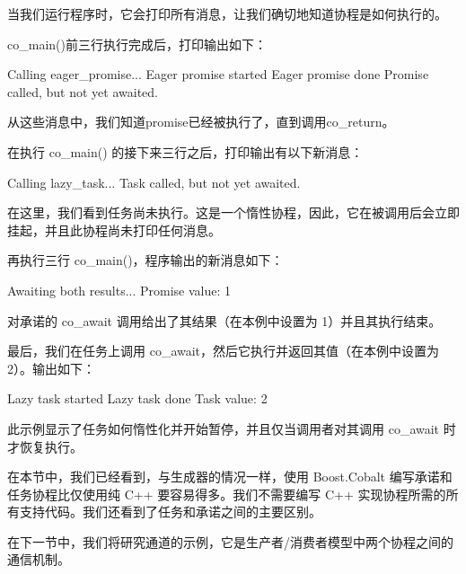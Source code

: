 当我们运行程序时，它会打印所有消息，让我们确切地知道协程是如何执行的。

co\_main()前三行执行完成后，打印输出如下：

\begin{shell}
Calling eager_promise...
Eager promise started
Eager promise done
Promise called, but not yet awaited.
\end{shell}

从这些消息中，我们知道promise已经被执行了，直到调用co\_return。

在执行 co\_main() 的接下来三行之后，打印输出有以下新消息：

\begin{shell}
Calling lazy_task...
Task called, but not yet awaited.
\end{shell}

在这里，我们看到任务尚未执行。这是一个惰性协程，因此，它在被调用后会立即挂起，并且此协程尚未打印任何消息。

再执行三行 co\_main()，程序输出的新消息如下：

\begin{shell}
Awaiting both results...
Promise value: 1
\end{shell}

对承诺的 co\_await 调用给出了其结果（在本例中设置为 1）并且其执行结束。

最后，我们在任务上调用 co\_await，然后它执行并返回其值（在本例中设置为 2）。输出如下：

\begin{shell}
Lazy task started
Lazy task done
Task value: 2
\end{shell}

此示例显示了任务如何惰性化并开始暂停，并且仅当调用者对其调用 co\_await 时才恢复执行。

在本节中，我们已经看到，与生成器的情况一样，使用 Boost.Cobalt 编写承诺和任务协程比仅使用纯 C++ 要容易得多。我们不需要编写 C++ 实现协程所需的所有支持代码。我们还看到了任务和承诺之间的主要区别。

在下一节中，我们将研究通道的示例，它是生产者/消费者模型中两个协程之间的通信机制。

